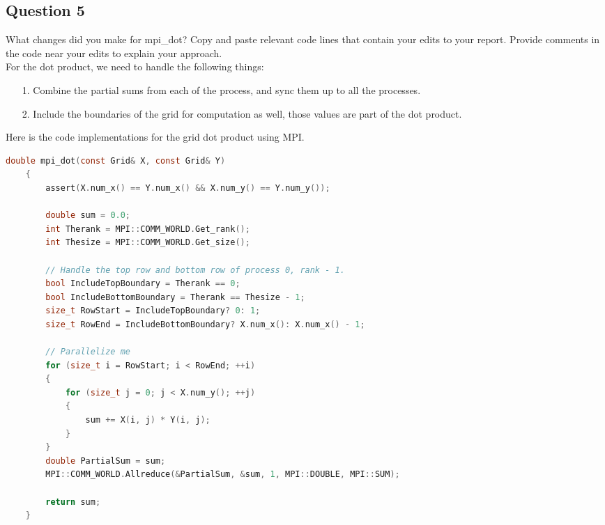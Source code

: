 \documentclass[]{article}
\begin{document}
            \subsection*{Question 5}
                What changes did you make for mpi\_dot? Copy and paste relevant code lines that contain your edits to your report. Provide comments in the code near your edits to explain your approach.
                \\[1.1em]
                For the dot product, we need to handle the following things: 
                \begin{enumerate}
                    \item[1.] Combine the partial sums from each of the process, and sync them up to all the processes. 
                    \item[2.] Include the boundaries of the grid for computation as well, those values are part of the dot product.  
                \end{enumerate}
                Here is the code implementations for the grid dot product using MPI. 
                \begin{lstlisting}[language=c]
    double mpi_dot(const Grid& X, const Grid& Y) 
    {
        assert(X.num_x() == Y.num_x() && X.num_y() == Y.num_y());

        double sum = 0.0;
        int Therank = MPI::COMM_WORLD.Get_rank();
        int Thesize = MPI::COMM_WORLD.Get_size();

        // Handle the top row and bottom row of process 0, rank - 1.
        bool IncludeTopBoundary = Therank == 0; 
        bool IncludeBottomBoundary = Therank == Thesize - 1;
        size_t RowStart = IncludeTopBoundary? 0: 1; 
        size_t RowEnd = IncludeBottomBoundary? X.num_x(): X.num_x() - 1;

        // Parallelize me
        for (size_t i = RowStart; i < RowEnd; ++i) 
        {
            for (size_t j = 0; j < X.num_y(); ++j) 
            {
                sum += X(i, j) * Y(i, j);
            }
        }
        double PartialSum = sum; 
        MPI::COMM_WORLD.Allreduce(&PartialSum, &sum, 1, MPI::DOUBLE, MPI::SUM);

        return sum;
    }
                \end{lstlisting}
\end{document}
